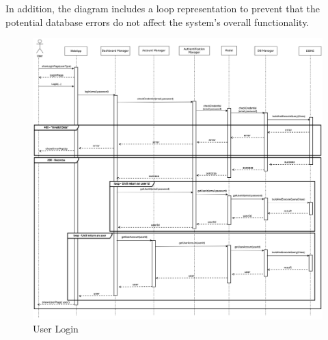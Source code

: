 \documentclass[a4paper,12pt]{article}
\begin{document}
    In addition, the diagram includes a loop representation to prevent that the potential database errors do not affect the system's overall functionality.
    \begin{figure}[H]
    \centering
    \includegraphics[scale = 0.30]{DD_figures/RuntimeView/UserLogin.drawio.png}
    \caption{User Login}
\end{figure}

\newpage
\end{document}
